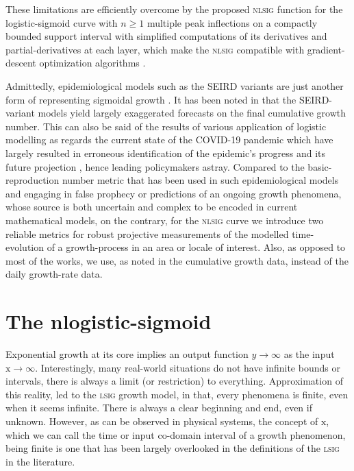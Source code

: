 \documentclass[journal]{IEEEtran}
\theoremstyle{plain}
\theoremstyle{definition}
\theoremstyle{remark}
\begin{document}
These limitations are efficiently overcome by the proposed \textsc{nlsig} function for the logistic-sigmoid curve with $n\ge1$ multiple peak inflections on a compactly bounded support interval with simplified computations of its derivatives and partial-derivatives at each layer, which make the \textsc{nlsig} compatible with gradient-descent optimization algorithms \cite{hanInfluenceSigmoidFunction1995,werbosBackpropagationTimeWhat1990}.

Admittedly, epidemiological models such as the SEIRD variants \cite{leeEstimationCOVID19Spread2020,okabeMathematicalModelEpidemics2020} are just another form of representing sigmoidal growth \cite{xsRichardsModelRevisited2012}. It has been noted in \cite{christopoulosNovelApproachEstimating2020} that the SEIRD-variant models yield largely exaggerated forecasts on the final cumulative growth number. This can also be said of the results of various application of logistic modelling as regards the current state of the COVID-19 pandemic which have largely resulted in erroneous identification of the epidemic's progress and its future projection \cite{matthewWhyModelingSpread2020, batistaEstimationStateCorona2020, wuGeneralizedLogisticGrowth2020}, hence leading policymakers astray. Compared to the basic-reproduction number metric that has been used in such epidemiological models \cite{xsRichardsModelRevisited2012} and engaging in false prophecy or predictions of an ongoing growth phenomena, whose source is both uncertain and complex to be encoded in current mathematical models, on the contrary, for the \textsc{nlsig} curve we introduce two reliable metrics for robust projective measurements of the modelled time-evolution of a growth-process in an area or locale of interest. Also, as opposed to most of the works, we use, as noted in \cite{christopoulosEfficientIdentificationInflection2016} the cumulative growth data, instead of the daily growth-rate data.

\section{The \textbf{n}logistic-sigmoid}\label{sec_thenlsig}

Exponential growth at its core implies an output function $y\to\infty$ as the input $\mathrm{x}\to\infty$. Interestingly, many real-world situations do not have infinite bounds or intervals, there is always a limit (or restriction) to everything. Approximation of this reality, led to the \textsc{lsig} growth model, in that, every phenomena is finite, even when it seems infinite. There is always a clear beginning and end, even if unknown. However, as can be observed in physical systems, the concept of $\mathrm{x}$, which we can call the time or input co-domain interval of a growth phenomenon, being finite is one that has been largely overlooked in the definitions of the \textsc{lsig} in the literature.
\end{document}
